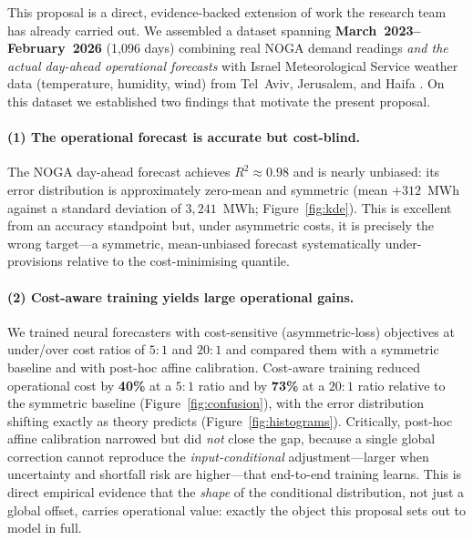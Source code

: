 \documentclass[12pt,a4paper]{article}
\begin{document}
This proposal is a direct, evidence-backed extension of work the research team has already carried
out. We assembled a dataset spanning \textbf{March~2023--February~2026} (1{,}096 days)
combining real NOGA demand readings \emph{and the actual day-ahead operational forecasts}
with Israel Meteorological Service weather data (temperature, humidity, wind) from
Tel~Aviv, Jerusalem, and Haifa \parencite{noga,ims}. On this dataset we established two
findings that motivate the present proposal.

\paragraph{(1) The operational forecast is accurate but cost-blind.}
The NOGA day-ahead forecast achieves $R^2\approx 0.98$ and is nearly unbiased: its error
distribution is approximately zero-mean and symmetric (mean $+312$~MWh against a standard
deviation of $3{,}241$~MWh; Figure~\ref{fig:kde}). This is excellent from an accuracy
standpoint but, under asymmetric costs, it is precisely the wrong target---a symmetric,
mean-unbiased forecast systematically under-provisions relative to the cost-minimising
quantile.

\paragraph{(2) Cost-aware training yields large operational gains.}
We trained neural forecasters with cost-sensitive (asymmetric-loss) objectives at
under/over cost ratios of $5\!:\!1$ and $20\!:\!1$ and compared them with a symmetric baseline and
with post-hoc affine calibration. Cost-aware training reduced operational cost by
\textbf{40\%} at a $5\!:\!1$ ratio and by \textbf{73\%} at a $20\!:\!1$ ratio relative to
the symmetric baseline (Figure~\ref{fig:confusion}), with the error distribution shifting
exactly as theory predicts (Figure~\ref{fig:histograms}). Critically, post-hoc affine
calibration narrowed but did \emph{not} close the gap, because a single global correction
cannot reproduce the \emph{input-conditional} adjustment---larger when uncertainty and
shortfall risk are higher---that end-to-end training learns. This is direct empirical
evidence that the \emph{shape} of the conditional distribution, not just a global offset,
carries operational value: exactly the object this proposal sets out to model in full.
\end{document}
